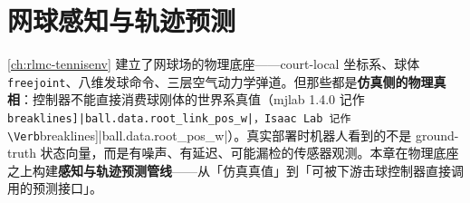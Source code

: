 \chapter{网球感知与轨迹预测}\label{ch:rlmc-tennisperc}


\cref{ch:rlmc-tennisenv} 建立了网球场的物理底座——court-local 坐标系、球体 \verb|freejoint|、八维发球命令、三层空气动力学弹道。但那些都是\textbf{仿真侧的物理真相}：控制器不能直接消费球刚体的世界系真值（mjlab 1.4.0 记作 \Verb[breaklines]|ball.data.root_link_pos_w|，Isaac Lab 记作 \Verb[breaklines]|ball.data.root_pos_w|）。真实部署时机器人看到的不是 ground-truth 状态向量，而是有噪声、有延迟、可能漏检的传感器观测。本章在物理底座之上构建\textbf{感知与轨迹预测管线}——从「仿真真值」到「可被下游击球控制器直接调用的预测接口」。

